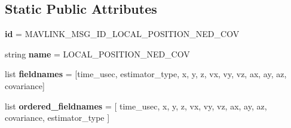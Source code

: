 \subsection*{Static Public Attributes}
\begin{DoxyCompactItemize}
\item 
\mbox{\label{classpymavlink_1_1dialects_1_1v10_1_1MAVLink__local__position__ned__cov__message_a361368404d138883b2f86d60d6d3b22f}} 
{\bfseries id} = M\+A\+V\+L\+I\+N\+K\+\_\+\+M\+S\+G\+\_\+\+I\+D\+\_\+\+L\+O\+C\+A\+L\+\_\+\+P\+O\+S\+I\+T\+I\+O\+N\+\_\+\+N\+E\+D\+\_\+\+C\+OV
\item 
\mbox{\label{classpymavlink_1_1dialects_1_1v10_1_1MAVLink__local__position__ned__cov__message_a042ac6dd313ce8bc7d71f70b6f99a97f}} 
string {\bfseries name} = \textquotesingle{}L\+O\+C\+A\+L\+\_\+\+P\+O\+S\+I\+T\+I\+O\+N\+\_\+\+N\+E\+D\+\_\+\+C\+OV\textquotesingle{}
\item 
\mbox{\label{classpymavlink_1_1dialects_1_1v10_1_1MAVLink__local__position__ned__cov__message_ab27d829b95c1da52973bbf6413edfb23}} 
list {\bfseries fieldnames} = \mbox{[}\textquotesingle{}time\+\_\+usec\textquotesingle{}, \textquotesingle{}estimator\+\_\+type\textquotesingle{}, \textquotesingle{}x\textquotesingle{}, \textquotesingle{}y\textquotesingle{}, \textquotesingle{}z\textquotesingle{}, \textquotesingle{}vx\textquotesingle{}, \textquotesingle{}vy\textquotesingle{}, \textquotesingle{}vz\textquotesingle{}, \textquotesingle{}ax\textquotesingle{}, \textquotesingle{}ay\textquotesingle{}, \textquotesingle{}az\textquotesingle{}, \textquotesingle{}covariance\textquotesingle{}\mbox{]}
\item 
\mbox{\label{classpymavlink_1_1dialects_1_1v10_1_1MAVLink__local__position__ned__cov__message_ae310bc3cb6f63205427710df5eccf817}} 
list {\bfseries ordered\+\_\+fieldnames} = \mbox{[} \textquotesingle{}time\+\_\+usec\textquotesingle{}, \textquotesingle{}x\textquotesingle{}, \textquotesingle{}y\textquotesingle{}, \textquotesingle{}z\textquotesingle{}, \textquotesingle{}vx\textquotesingle{}, \textquotesingle{}vy\textquotesingle{}, \textquotesingle{}vz\textquotesingle{}, \textquotesingle{}ax\textquotesingle{}, \textquotesingle{}ay\textquotesingle{}, \textquotesingle{}az\textquotesingle{}, \textquotesingle{}covariance\textquotesingle{}, \textquotesingle{}estimator\+\_\+type\textquotesingle{} \mbox{]}

\end{DoxyCompactItemize}
